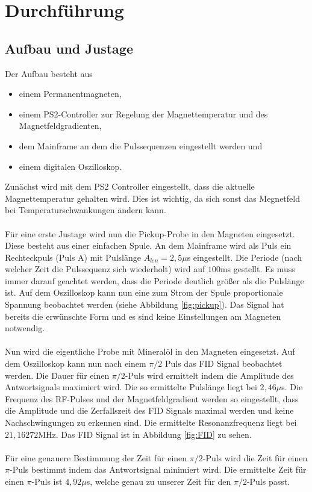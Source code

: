 \section{Durchführung}
\subsection{Aufbau und Justage}
Der Aufbau besteht aus 

\begin{itemize}
  \item einem Permanentmagneten,
    \item einem PS2-Controller zur Regelung der Magnettemperatur und des Magnetfeldgradienten,
      \item dem Mainframe an dem die Pulssequenzen eingestellt werden und
        \item einem digitalen Oszilloskop.
\end{itemize}

Zunächst wird mit dem PS2 Controller eingestellt, dass die aktuelle Magnettemperatur gehalten wird. Dies ist wichtig, da sich sonst das Megnetfeld bei Temperaturschwankungen ändern kann. \\ \\
Für eine erste Justage wird nun die Pickup-Probe in den Magneten eingesetzt. Diese besteht aus einer einfachen Spule. An dem Mainframe wird als Puls ein Rechteckpuls (Puls A) mit Pulslänge $A_{len}=2,5\mu$s eingestellt. Die Periode (nach welcher Zeit die Pulssequenz sich wiederholt) wird auf $100$ms gestellt. Es muss immer darauf geachtet werden, dass die Periode deutlich größer als die Pulslänge ist. Auf dem Oszilloskop kann nun eine zum Strom der Spule proportionale Spannung beobachtet werden (siehe Abbildung \ref{fig:pickup}). Das Signal hat bereits die erwünschte Form und es sind keine Einstellungen am Magneten notwendig.\\ \\
Nun wird die eigentliche Probe mit Mineralöl in den Magneten eingesetzt. Auf dem Oszilloskop kann nun nach einem $\pi/2$ Puls das FID Signal beobachtet werden. Die Dauer für einen $\pi/2$-Puls wird ermittelt indem die Amplitude des Antwortsignals maximiert wird. Die so ermittelte Pulslänge liegt bei $2,46 \mu$s. Die Frequenz des RF-Pulses und der Magnetfeldgradient werden so eingestellt, dass die Amplitude und die Zerfallszeit des FID Signals maximal werden und keine Nachschwingungen zu erkennen sind. Die ermittelte Resonanzfrequenz liegt bei $21,16272$MHz. Das FID Signal ist in Abbildung \ref{fig:FID} zu sehen. \\ \\
Für eine genauere Bestimmung der Zeit für einen $\pi/2$-Puls wird die Zeit für einen $\pi$-Puls bestimmt indem das Antwortsignal minimiert wird. Die ermittelte Zeit für einen $\pi$-Puls ist $4,92\mu$s, welche genau zu unserer Zeit für den $\pi/2$-Puls passt.

